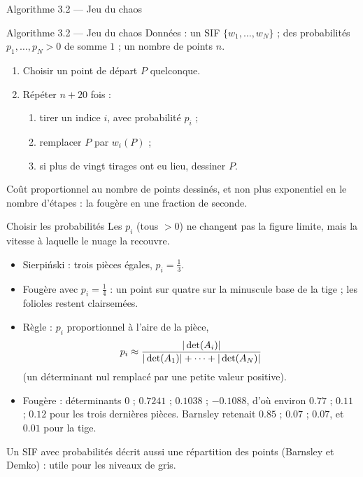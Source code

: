 \begin{frame}{Algorithme 3.2 --- Jeu du chaos}
  \begin{Algo}{Algorithme 3.2 --- Jeu du chaos}
    Données : un SIF $\{w_1,\dots,w_N\}$ ; des probabilités
    $p_1,\dots,p_N>0$ de somme $1$ ; un nombre de points $n$.
    \begin{enumerate}
      \item Choisir un point de départ $P$ quelconque.
      \item Répéter $n+20$ fois :
        \begin{enumerate}
          \item[(a)] tirer un indice $i$, avec probabilité $p_i$ ;
          \item[(b)] remplacer $P$ par $w_i(P)$ ;
          \item[(c)] si plus de vingt tirages ont eu lieu, dessiner $P$.
        \end{enumerate}
    \end{enumerate}
  \end{Algo}
  \small Coût proportionnel au nombre de points dessinés, et non plus
  exponentiel en le nombre d'étapes : la fougère en une fraction de
  seconde.
\end{frame}

\begin{frame}{Choisir les probabilités}
  \small Les $p_i$ (tous $>0$) ne changent pas la figure limite, mais la
  vitesse à laquelle le nuage la recouvre.
  \begin{itemize}
    \item Sierpiński : trois pièces égales, $p_i=\tfrac13$.
    \item Fougère avec $p_i=\tfrac14$ : un point sur quatre sur la
      minuscule base de la tige ; les folioles restent clairsemées.
    \item Règle : $p_i$ proportionnel à l'aire de la pièce,
      \[
        p_i \approx \frac{|\operatorname{det}(A_i)|}{|\operatorname{det}(A_1)|+\cdots+|\operatorname{det}(A_N)|}
      \]
      (un déterminant nul remplacé par une petite valeur positive).
    \item Fougère : déterminants $0$ ; $\num{0.7241}$ ; $\num{0.1038}$ ;
      $\num{-0.1088}$, d'où environ $\num{0.77}$ ; $\num{0.11}$ ;
      $\num{0.12}$ pour les trois dernières pièces. Barnsley retenait
      $\num{0.85}$ ; $\num{0.07}$ ; $\num{0.07}$, et $\num{0.01}$ pour la
      tige.
  \end{itemize}
  \footnotesize Un SIF avec probabilités décrit aussi une répartition des
  points (Barnsley et Demko) : utile pour les niveaux de gris.
\end{frame}

